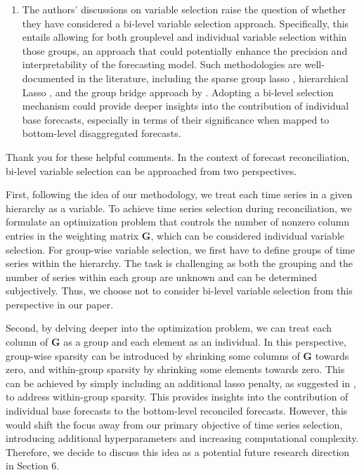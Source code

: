 \documentclass[11pt,a4paper,]{article}
\providecommand{\tightlist}{%
  \setlength{\itemsep}{0pt}\setlength{\parskip}{0pt}}
\renewenvironment{quote}
               {\list{}{\rightmargin\leftmargin}%
                \item\relax\color[RGB]{0,150,0}}
               {\endlist}
\begin{document}
\begin{enumerate}
\def\labelenumi{\arabic{enumi}.}
\setcounter{enumi}{1}
\tightlist
\item
  The authors' discussions on variable selection raise the question of
  whether they have considered a bi-level variable selection approach.
  Specifically, this entails allowing for both grouplevel and individual
  variable selection within those groups, an approach that could
  potentially enhance the precision and interpretability of the
  forecasting model. Such methodologies are well-documented in the
  literature, including the sparse group lasso \autocite{Simon2013-sp},
  hierarchical Lasso \autocite{Zhou2010-vs}, and the group bridge
  approach by \textcite{Huang2009-vs}. Adopting a bi-level selection
  mechanism could provide deeper insights into the contribution of
  individual base forecasts, especially in terms of their significance
  when mapped to bottom-level disaggregated forecasts.
\end{enumerate}

\begin{quote}
Thank you for these helpful comments. In the context of forecast
reconciliation, bi-level variable selection can be approached from two
perspectives.

First, following the idea of our methodology, we treat each time series
in a given hierarchy as a variable. To achieve time series selection
during reconciliation, we formulate an optimization problem that
controls the number of nonzero column entries in the weighting matrix
\(\bm{G}\), which can be considered individual variable selection. For
group-wise variable selection, we first have to define groups of time
series within the hierarchy. The task is challenging as both the
grouping and the number of series within each group are unknown and can
be determined subjectively. Thus, we choose not to consider bi-level
variable selection from this perspective in our paper.

Second, by delving deeper into the optimization problem, we can treat
each column of \(\bm{G}\) as a group and each element as an individual.
In this perspective, group-wise sparsity can be introduced by shrinking
some columns of \(\bm{G}\) towards zero, and within-group sparsity by
shrinking some elements towards zero. This can be achieved by simply
including an additional lasso penalty, as suggested in
\textcite{Simon2013-sp}, to address within-group sparsity. This provides
insights into the contribution of individual base forecasts to the
bottom-level reconciled forecasts. However, this would shift the focus
away from our primary objective of time series selection, introducing
additional hyperparameters and increasing computational complexity.
Therefore, we decide to discuss this idea as a potential future research
direction in Section 6.
\end{quote}
\end{document}
